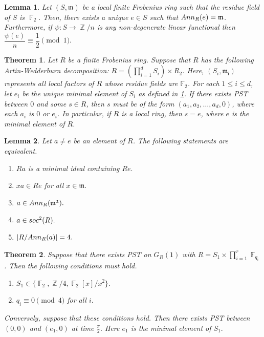 \documentclass[10pt,a4paper]{amsart}
\newtheorem{thm}{Theorem}
\newtheorem{lem}{Lemma}
\newcommand{\Ann}{{\rm Ann}}
\DeclareMathOperator{\F}{\mathbb{F}}
\DeclareMathOperator{\Z}{\mathbb{Z}}
\newcommand{\soc}{{{\rm soc}}}
\begin{document}
\begin{lem} \label{lem:local}
    Let $(S, \mathfrak{m})$ be a local finite Frobenius ring such that the residue field of $S$ is $\F_2.$ Then, there exists a unique $e \in S$ such that $\Ann_{R}(e)=\mathfrak{m}$. Furthermore, if $\psi\colon S \to \Z/n$ is any non-degenerate linear functional then $\dfrac{\psi(e)}{n} \equiv \dfrac{1}{2} \pmod{1}.$ 
\end{lem}

\begin{thm} \label{prop:upper_bound}
Let $R$ be a finite Frobenius ring. Suppose that $R$ has the following Artin-Wedderburn decomposition: $R = (\prod_{i=1}^d S_i) \times R_2$. Here, $(S_i, \mathfrak{m_i})$ represents all local factors of $R$ whose residue fields are $\mathbb{F}_2$. For each $1 \leq i \leq d$, let $e_i$ be the unique minimal element of $S_i$ as defined in \cref{lem:local}. If there exists PST between $0$ and some $s \in R$, then $s$ must be of the form $(a_1, a_2, \ldots, a_d, 0)$, where each $a_i$ is $0$ or $e_i$. In particular, if $R$ is a local ring, then $s=e$, where $e$ is the minimal element of $R$. 
\end{thm}

\begin{lem} \label{lem:secondary_minimal}
\noindent
Let $a \neq e$ be an element of $R$. The following statements are equivalent. 
\begin{enumerate}
\item $Ra$ is a minimal ideal containing $Re.$
    \item  $xa \in Re$ for all $x \in \mathfrak{m}.$
    \item $a \in \Ann_{R}(\mathfrak{m^2}).$
    \item $a \in \soc^2(R).$
    \item $|R/\Ann_{R}(a)| = 4.$ 
\end{enumerate}
\end{lem}

\begin{thm} \label{thm:unitary}
    Suppose that there exists PST on $G_{R}(1)$ with $R=S_1 \times \prod_{i=1}^r \F_{q_i}$. Then the following conditions must hold. 
\begin{enumerate}
    \item $S_1 \in \{\F_2, \Z/4, \F_2[x]/x^2 \}.$
    \item $q_i \equiv 0 \pmod{4}$ for all $i.$
\end{enumerate}
Conversely, suppose that these conditions hold. Then there exists PST between $(0,0)$ and $(e_1, 0)$ at time $\frac{\pi}{2}.$ Here $e_1$ is the minimal element of $S_1.$
\end{thm}
\end{document}
